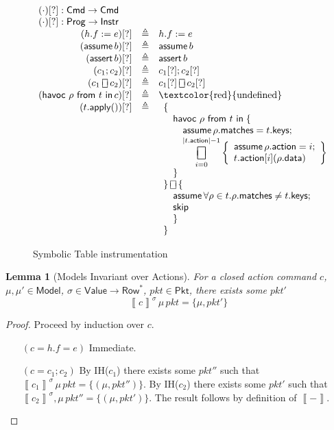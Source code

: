 \documentclass{article}
\newcommand{\pkt}{\mathit{pkt}}
\newcommand{\denote}[1]{\left\llbracket#1\right\rrbracket}
\newcommand{\Value}{\mathsf{Value}}
\newcommand{\Cmd}{\mathsf{Cmd}}
\newcommand{\Instr}{\mathsf{Instr}}
\newcommand{\Prog}{\mathsf{Prog}}
\newcommand{\Pkt}{\mathsf{Pkt}}
\newcommand{\Model}{\mathsf{Model}}
\newcommand{\Row}{\mathsf{Row}}
\newcommand{\matches}{\mathsf{matches}}
\newcommand{\action}{\mathsf{action}}
\newcommand{\keys}{\mathsf{keys}}
\newcommand{\data}{\mathsf{data}}
\newcommand{\assert}{\mathop{\mathsf{assert}}}
\newcommand{\assume}{\mathop{\mathsf{assume}}}
\newcommand{\apply}{\mathsf{apply}}
\newcommand{\choiceop}{\rotatebox[origin=c]{90}{$\sqsubset\!\!\!\sqsupset$}}
\newcommand{\choice}{\mathbin{\choiceop}}
\DeclareMathOperator*{\bigchoice}{\scalerel*{\choiceop}{\sum}}
\renewcommand{\choose}[2]{\mathop{\mathsf{havoc}~#1~\mathsf{from}~#2~\mathsf{in}}}
\newcommand{\SKIP}{\mathsf{skip}}
\newtheorem{lemma}{Lemma}
\begin{document}
\begin{figure}[htp]
  \[\begin{array}{r >{\triangleq}cl}
  \multicolumn{3}{l}{(\cdot)[?] : \Cmd \to \Cmd} \\
  \multicolumn{3}{l}{(\cdot)[?] : \Prog \to \Instr} \\
  (h.f := e)[?] && h.f := e \\
  (\assume b)[?] && \assume b \\
  (\assert b)[?] && \assert b\\
  (c_1;c_2)[?] && c_1[?];c_2[?]\\
  (c_1 \choice c_2)[?] && c_1[?] \choice c_2[?]\\
  (\choose \rho t c)[?] &&
  \textrm{\textcolor{red}{undefined}} \\
  (t.\apply())[?] &&
  \begin{array}[t]{l} \displaystyle
    \{ \\
    \quad \choose \rho t \;\{ \\
    \qquad \assume \rho.\matches = t.\keys; \\
    \qquad \displaystyle \bigchoice_{i=0}^{|t.\action| -1}
    \left\{\begin{array}{l}
    \assume \rho.\action = i;\\
    t.\action[i](\rho.\data)
    \end{array}\right\}\\
    \quad \} \\
    \} \choice \{ \\
    \quad \assume \forall \rho \in t. \rho.\matches \neq t.\keys; \\
    \quad \SKIP \\
    \quad \}\\
    \}
  \end{array}
  \end{array}
  \]
  \caption{Symbolic Table instrumentation}
  \label{fig:table-instrument}
\end{figure}


\begin{lemma}[Models Invariant over Actions]
  \label{lem:models-invariant-over-actions}
  For a closed action command $c$, $\mu,\mu'
  \in \Model$, $\sigma \in \Value \to
  \Row^*$, $\pkt \in \Pkt$, there exists some $\pkt'$
  \[\denote{c}^\sigma\,\mu\,\pkt = \{\mu,\pkt'\}\]
  \end{lemma}

\begin{proof}
  Proceed by induction over $c$.
  \begin{enumerate}[align=left]
  \item[$(c = h.f = e)$] Immediate.
  \item[$(c = c_1;c_2)$]
    By IH($c_1$) there exists some $\pkt''$ such that
    $\denote{c_1}^\sigma\,\mu\,\pkt = \{(\mu,\pkt'')\}$.
    By IH($c_2$) there exists some $\pkt'$ such that
    $\denote{c_2}^\sigma,\mu\,pkt'' = \{(\mu, \pkt')\}$.
    The result follows by definition of $\denote{-}$.
    \end{enumerate}
\end{proof}
\end{document}
